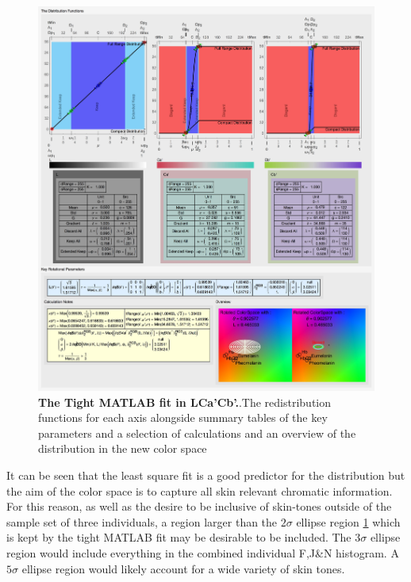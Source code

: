 \begin{figure}[h!]
  \centering
  \includegraphics[width=1.0 \textwidth]{Chapter3/Figs/Distribution_Results_Final.jpg} 
    \caption{ \textbf{The Tight MATLAB fit in LCa'Cb'.}.The redistribution functions for each axis alongside summary tables of the key parameters and a selection of calculations and an overview of the distribution in the new color space }  \label{fig:DistributionResultsFinal}
\end{figure}

It can be seen that the least square fit is a good predictor for the distribution but the aim of the color space is to capture all skin relevant chromatic information. For this reason,  as well as the desire to be inclusive of skin-tones outside of the sample set of three individuals, a region larger than the $2\sigma$ ellipse region \ref{fig:DistributionResultsFinal} which is kept by the tight MATLAB fit may be desirable to be included. The $3\sigma$ ellipse region would include everything in the combined individual F,J\&N histogram. A $5\sigma$ ellipse region would  likely account for a wide variety of skin tones. 

